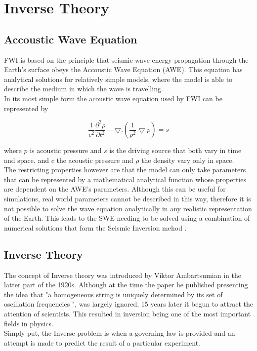 \chapter{Inverse Theory}
\label{ftheory}

\section{Accoustic Wave Equation } 
FWI is based on the principle that seismic wave energy propagation through the Earth’s surface obeys the Accoustic Wave Equation (AWE). This equation has analytical solutions for relatively simple models, where the model is able to describe the medium in which the wave is travelling. \\
In its most simple form the acoustic wave equation used by FWI can be represented by 

\begin{equation}
\frac{1}{c^{2}}\frac{\partial  ^{2}\rho }{\partial t^{2}} -\bigtriangledown.\left ( \frac{1}{\rho^{2}} \bigtriangledown p\right ) = s
\label{accoustic_wave_equation}
\end{equation}

where $p$ is acoustic pressure and $s$ is the driving source that both vary in time and space, and $c$ the acoustic pressure and $\rho$ the density vary only in space. \\
The restricting properties however are that the model can only take parameters that can be represented by a mathematical analytical function whose properties are dependent on the AWE's parameters. Although this can be useful for simulations, real world parameters cannot be described in this way, therefore it is not possible to solve the wave equation analytically in any realistic representation of the Earth. This leads to the SWE needing to be solved using a combination of numerical solutions that form the Seismic Inversion mehod \citep{pratt1998gauss}. 

\section{Inverse Theory } 
The concept of Inverse theory was introduced by Viktor Ambartsumian in the latter part of the 1920s. Although at the time the paper he published presenting the idea that  "a homogeneous string is uniquely determined by its set of oscillation frequencies \citep{ambartsumian1998life}", was largely ignored, 15 years later it begun to attract the attention of scientists. This resulted in inversion being one of the most important fields in physics. \\
Simply put, the Inverse problem is when a governing law is provided and an attempt is made to predict the result of a particular experiment. \\

